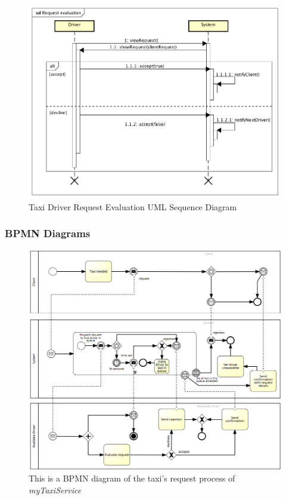 \documentclass[a4paper]{article}
\begin{document}
\begin{figure}[H]
\includegraphics[width=\sequenceWidth]{Sequence-TaxiDriver-RequestEvaluation}
\centering
\caption{Taxi Driver Request Evaluation UML Sequence Diagram}
\label{fig:sequencetaxidriverrequestevaluation}
\end{figure}

\subsubsection{BPMN Diagrams}

\begin{figure}[H]
\includegraphics[width=\sequenceWidth]{BPMN-rideRequest}
\centering
\caption[BPMN Taxi Call]{This is a BPMN diagram of the taxi's request process of \emph{myTaxiService}}
\label{fig:bpmndiagramrequest}
\end{figure}
\end{document}
